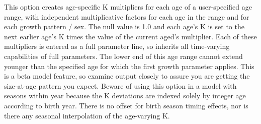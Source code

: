 This option creates age-specific K multipliers for each age of a user-specified age range, with independent multiplicative factors for each age in the range and for each growth pattern / sex.  The null value is 1.0 and each age's K is set to the next earlier age's K times the value of the current aged's multiplier.  Each of these multipliers is entered as a full parameter line, so inherits all time-varying capabilities of full parameters.  The lower end of this age range cannot extend younger than the specified age for which the first growth parameter applies.  This is a beta model feature, so examine output closely to assure you are getting the size-at-age pattern you expect.  Beware of using this option in a model with seasons within year because the K deviations are indexed solely by integer age according to birth year.  There is no offset for birth season timing effects, nor is there any seasonal interpolation of the age-varying K.


